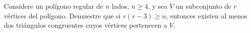 Considere un polígono regular de $n$ lados, $n \geq 4$, y sea $V$ un subconjunto de $r$ vértices del polígono. Demuestre que si $r(r-3) \geq n$, entonces existen al menos dos triángulos congruentes cuyos vértices pertenecen a $V$.
